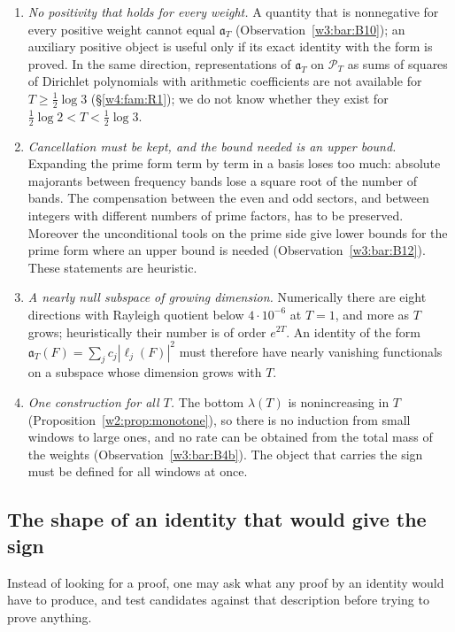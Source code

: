 \documentclass[11pt]{amsart}
\theoremstyle{definition}
\theoremstyle{remark}
\numberwithin{equation}{section}
\newcommand{\PT}{\mathcal{P}_T}                        %
\newcommand{\aT}{\mathfrak{a}_T}                       %
\newcommand{\lam}{\lambda(T)}                          %
\begin{document}
\begin{enumerate}[label=(\arabic*),leftmargin=*]
Two-sided asymptotic laws for $\lam$ are not excluded (\S\ref{w8:fam:R24}).
\item\label{w8:con:import}\label{w8:con:sos} \emph{No positivity that holds for every weight.} A quantity that is
nonnegative for every positive weight cannot equal $\aT$ (Observation~\ref{w3:bar:B10}); an auxiliary positive object is
useful only if its exact identity with the form is proved. In the same direction, representations of $\aT$ on
$\PT$ as sums of squares of Dirichlet polynomials with arithmetic coefficients are not available for
$T\ge\frac12\log3$ (\S\ref{w4:fam:R1}); we do not know whether they exist for $\frac12\log2<T<\frac12\log3$.
\item\label{w8:con:cancel}\label{w8:con:sign} \emph{Cancellation must be kept, and the bound needed is an upper
bound.} Expanding the prime form term by term in a basis loses too much: absolute majorants between frequency
bands lose a square root of the number of bands. The compensation between the even and odd sectors, and between
integers with different numbers of prime factors, has to be preserved. Moreover the unconditional tools on the
prime side give lower bounds for the prime form where an upper bound is needed (Observation~\ref{w3:bar:B12}). These
statements are heuristic.
\item\label{w8:con:nearnull} \emph{A nearly null subspace of growing dimension.} Numerically there are eight
directions with Rayleigh quotient below $4\cdot10^{-6}$ at $T=1$, and more as $T$ grows; heuristically their
number is of order $e^{2T}$. An identity of the form $\aT(F)=\sum_jc_j|\ell_j(F)|^2$ must therefore have nearly
vanishing functionals on a subspace whose dimension grows with $T$.
\item\label{w8:con:uniform} \emph{One construction for all $T$.} The bottom $\lam$ is nonincreasing in $T$
(Proposition~\ref{w2:prop:monotone}), so there is no induction from small windows to large ones, and no rate can
be obtained from the total mass of the weights (Observation~\ref{w3:bar:B4b}). The object that carries the sign must
be defined for all windows at once.
\end{enumerate}

\subsection{The shape of an identity that would give the sign}\label{w8:fam:R26}

Instead of looking for a proof, one may ask what any proof by an identity would have to produce, and test
candidates against that description before trying to prove anything.
\end{document}
